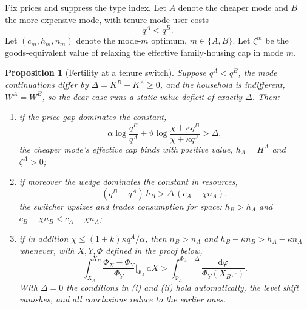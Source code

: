 \documentclass[11pt]{article}
\newtheorem{proposition}{Proposition}
\newcommand{\dd}{\mathrm d}
\newcommand{\1}{\mathbf 1}
\begin{document}
Fix prices and suppress the type index. Let $A$ denote the cheaper mode and $B$ the more expensive mode, with tenure-mode user costs
\[
q^A<q^B.
\]
Let $(c_m,h_m,n_m)$ denote the mode-$m$ optimum, $m\in\{A,B\}$. Let $\zeta^m$ be the goods-equivalent value of relaxing the effective family-housing cap in mode $m$.

\begin{proposition}[Fertility at a tenure switch]
\label{prop:tenure_switch_fertility}
Suppose $q^A<q^B$, the mode continuations differ by $\Delta=K^B-K^A\ge0$, and the household is indifferent, $W^A=W^B$, so the dear case runs a static-value deficit of exactly $\Delta$. Then:
\begin{enumerate}[label=(\roman*)]
\item if the price gap dominates the constant,
\[
\alpha\log\frac{q^B}{q^A}+\vartheta\log\frac{\chi+\kappa q^B}{\chi+\kappa q^A}>\Delta,
\]
the cheaper mode's effective cap binds with positive value, $h_A=H^A$ and $\zeta^A>0$;
\item if moreover the wedge dominates the constant in resources,
\[
(q^B-q^A)\,h_B>\Delta\,(c_A-\chi n_A),
\]
the switcher upsizes and trades consumption for space: $h_B>h_A$ and $c_B-\chi n_B<c_A-\chi n_A$;
\item if in addition $\chi\le(1+k)\kappa q^A/\alpha$, then $n_B>n_A$ and $h_B-\kappa n_B>h_A-\kappa n_A$ whenever, with $X,Y,\Phi$ defined in the proof below,
\[
\int_{X_A}^{X_B}
\frac{\Phi_X-\Phi_Y}{\Phi_Y}\bigg|_{\Phi_A}\,\dd X
>
\int_{\Phi_A}^{\Phi_A+\Delta}
\frac{\dd\varphi}{\Phi_Y(X_B,\cdot)}.
\]
With $\Delta=0$ the conditions in (i) and (ii) hold automatically, the level shift vanishes, and all conclusions reduce to the earlier ones.
\end{enumerate}
\end{proposition}
\end{document}
